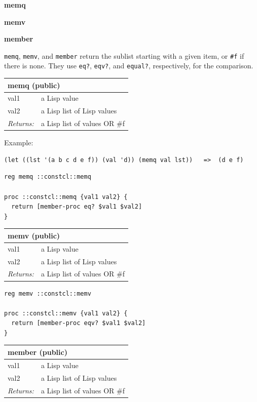 \documentclass[twoside,9pt]{report}
\begin{document}
\textbf{memq}


\textbf{memv}


\textbf{member}


\texttt{memq}, \texttt{memv}, and \texttt{member} return the sublist starting with a given item, or \texttt{\#f} if there is none. They use \texttt{eq?}, \texttt{eqv?}, and \texttt{equal?}, respectively, for the comparison.

\begin{tabular}{ |l l| }
\hline
\multicolumn{2}{|l|}{memq (public)} \\
\hline
val1 & a Lisp value \\
val2 & a Lisp list of Lisp values \\
\textit{Returns:} & a Lisp list of values OR \#f \\
\hline
\end{tabular}


Example:

\noindent\makebox[\linewidth]{\rule{\linewidth}{0.4pt}}
\begin{lstlisting}
(let ((lst '(a b c d e f)) (val 'd)) (memq val lst))   =>  (d e f)
\end{lstlisting}
\noindent\makebox[\linewidth]{\rule{\linewidth}{0.4pt}}
\noindent\makebox[\linewidth]{\rule{\linewidth}{0.4pt}}
\begin{lstlisting}
reg memq ::constcl::memq
 
proc ::constcl::memq {val1 val2} {
  return [member-proc eq? $val1 $val2]
}
\end{lstlisting}
\noindent\makebox[\linewidth]{\rule{\linewidth}{0.4pt}}
\begin{tabular}{ |l l| }
\hline
\multicolumn{2}{|l|}{memv (public)} \\
\hline
val1 & a Lisp value \\
val2 & a Lisp list of Lisp values \\
\textit{Returns:} & a Lisp list of values OR \#f \\
\hline
\end{tabular}

\noindent\makebox[\linewidth]{\rule{\linewidth}{0.4pt}}
\begin{lstlisting}
reg memv ::constcl::memv
 
proc ::constcl::memv {val1 val2} {
  return [member-proc eqv? $val1 $val2]
}
\end{lstlisting}
\noindent\makebox[\linewidth]{\rule{\linewidth}{0.4pt}}
\begin{tabular}{ |l l| }
\hline
\multicolumn{2}{|l|}{member (public)} \\
\hline
val1 & a Lisp value \\
val2 & a Lisp list of Lisp values \\
\textit{Returns:} & a Lisp list of values OR \#f \\
\hline
\end{tabular}
\end{document}
